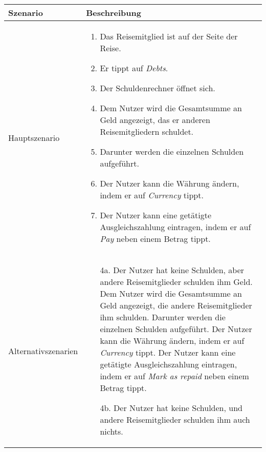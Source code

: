 \begin{table}[H]
\begin{tabularx}{0.95\textwidth}{ |l|X| }
		\hline
		\rowcolor{lightgray} \textbf{Szenario} & \textbf{Beschreibung}                                                                                                                  \\
		\hline
		Hauptszenario                          & \begin{enumerate}
			                                         \item Das Reisemitglied ist auf der Seite der Reise.
			                                         \item Er tippt auf \emph{Debts}.
			                                         \item Der Schuldenrechner öffnet sich.
			                                         \item Dem Nutzer wird die Gesamtsumme an Geld angezeigt, das er anderen Reisemitgliedern schuldet.
			                                         \item Darunter werden die einzelnen Schulden aufgeführt.
			                                         \item Der Nutzer kann die Währung ändern, indem er auf \emph{Currency} tippt.
			                                         \item Der Nutzer kann eine getätigte Ausgleichszahlung eintragen, indem er auf \emph{Pay} neben einem Betrag tippt.
		                                         \end{enumerate}                     \\
		\hline
		Alternativszenarien                    & \begin{enumerate}
			                                         \item[4a.] Der Nutzer hat keine Schulden, aber andere Reisemitglieder schulden ihm Geld.
				                                         \subitem[4a1.] Dem Nutzer wird die Gesamtsumme an Geld angezeigt, die andere Reisemitglieder ihm schulden.
				                                         \subitem[4a2.] Darunter werden die einzelnen Schulden aufgeführt.
				                                         \subitem[4a3.] Der Nutzer kann die Währung ändern, indem er auf \emph{Currency} tippt.
				                                         \subitem[4a4.] Der Nutzer kann eine getätigte Ausgleichszahlung eintragen, indem er auf \emph{Mark as repaid} neben einem Betrag tippt.
			                                         \item[4b.] Der Nutzer hat keine Schulden, und andere Reisemitglieder schulden ihm auch nichts.

\end{enumerate}
\end{tabularx}
\end{table}
